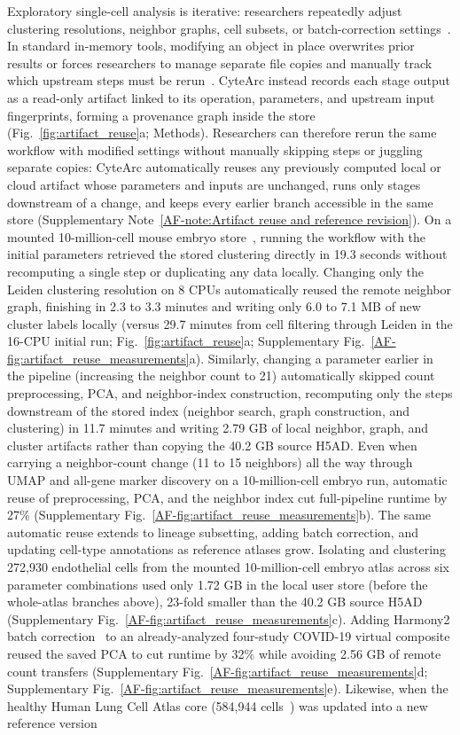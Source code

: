 \documentclass[11pt]{article}
\newcommand{\sref}[1]{\ref*{AF-#1}}
\begin{document}
Exploratory single-cell analysis is iterative: researchers repeatedly adjust clustering resolutions, neighbor graphs, cell subsets, or batch-correction settings~\cite{luecken2019bestpractice}. In standard in-memory tools, modifying an object in place overwrites prior results or forces researchers to manage separate file copies and manually track which upstream steps must be rerun~\cite{wolf2018}. CyteArc instead records each stage output as a read-only artifact linked to its operation, parameters, and upstream input fingerprints, forming a provenance graph inside the store (Fig.~\ref{fig:artifact_reuse}a; Methods). Researchers can therefore rerun the same workflow with modified settings without manually skipping steps or juggling separate copies: CyteArc automatically reuses any previously computed local or cloud artifact whose parameters and inputs are unchanged, runs only stages downstream of a change, and keeps every earlier branch accessible in the same store (Supplementary Note~\sref{note:Artifact reuse and reference revision}). On a mounted 10-million-cell mouse embryo store~\cite{qiu2024}, running the workflow with the initial parameters retrieved the stored clustering directly in 19.3 seconds without recomputing a single step or duplicating any data locally. Changing only the Leiden clustering resolution on 8 CPUs automatically reused the remote neighbor graph, finishing in 2.3 to 3.3 minutes and writing only 6.0 to 7.1 MB of new cluster labels locally (versus 29.7 minutes from cell filtering through Leiden in the 16-CPU initial run; Fig.~\ref{fig:artifact_reuse}a; Supplementary Fig.~\sref{fig:artifact_reuse_measurements}a). Similarly, changing a parameter earlier in the pipeline (increasing the neighbor count to 21) automatically skipped count preprocessing, PCA, and neighbor-index construction, recomputing only the steps downstream of the stored index (neighbor search, graph construction, and clustering) in 11.7 minutes and writing 2.79 GB of local neighbor, graph, and cluster artifacts rather than copying the 40.2 GB source H5AD. Even when carrying a neighbor-count change (11 to 15 neighbors) all the way through UMAP and all-gene marker discovery on a 10-million-cell embryo run, automatic reuse of preprocessing, PCA, and the neighbor index cut full-pipeline runtime by 27\% (Supplementary Fig.~\sref{fig:artifact_reuse_measurements}b). The same automatic reuse extends to lineage subsetting, adding batch correction, and updating cell-type annotations as reference atlases grow. Isolating and clustering 272,930 endothelial cells from the mounted 10-million-cell embryo atlas across six parameter combinations used only 1.72 GB in the local user store (before the whole-atlas branches above), 23-fold smaller than the 40.2 GB source H5AD (Supplementary Fig.~\sref{fig:artifact_reuse_measurements}c). Adding Harmony2 batch correction~\cite{korsunsky2019,patikas2026integration} to an already-analyzed four-study COVID-19 virtual composite reused the saved PCA to cut runtime by 32\% while avoiding 2.56 GB of remote count transfers (Supplementary Fig.~\sref{fig:artifact_reuse_measurements}d; Supplementary Fig.~\sref{fig:artifact_reuse_measurements}e). Likewise, when the healthy Human Lung Cell Atlas core (584,944 cells~\cite{sikkema2023}) was updated into a new reference version 
\end{document}
